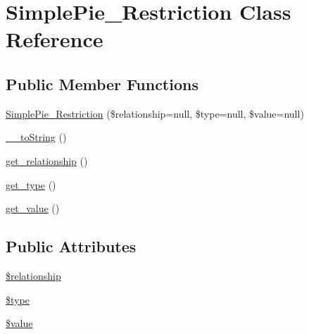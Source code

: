 \hypertarget{class_simple_pie___restriction}{\section{Simple\-Pie\-\_\-\-Restriction Class Reference}
\label{class_simple_pie___restriction}
}
\subsection*{Public Member Functions}
\begin{DoxyCompactItemize}
\item 
\hyperlink{class_simple_pie___restriction_a031d3ff1d44ff9b73b6a3c0ee2013953}{Simple\-Pie\-\_\-\-Restriction} (\$relationship=null, \$type=null, \$value=null)
\item 
\hyperlink{class_simple_pie___restriction_a81ed447fbfee3073c4a641e12ab9aaec}{\-\_\-\-\_\-to\-String} ()
\item 
\hyperlink{class_simple_pie___restriction_a3cbd52bf0d393cfa2200ec3df26eeed8}{get\-\_\-relationship} ()
\item 
\hyperlink{class_simple_pie___restriction_a5315bda246beb7965f1b447f669dd664}{get\-\_\-type} ()
\item 
\hyperlink{class_simple_pie___restriction_a39f175e64dc31b5811b901e964379b32}{get\-\_\-value} ()
\end{DoxyCompactItemize}
\subsection*{Public Attributes}
\begin{DoxyCompactItemize}
\item 
\hyperlink{class_simple_pie___restriction_ab72bd2d88e09dcb5e771b0dbb3681656}{\$relationship}
\item 
\hyperlink{class_simple_pie___restriction_a3bac2070818d8d2f56f479027d0c98d1}{\$type}
\item 
\hyperlink{class_simple_pie___restriction_ab0e85bfb910ad09a722d9e82f78a7a97}{\$value}
\end{DoxyCompactItemize}


